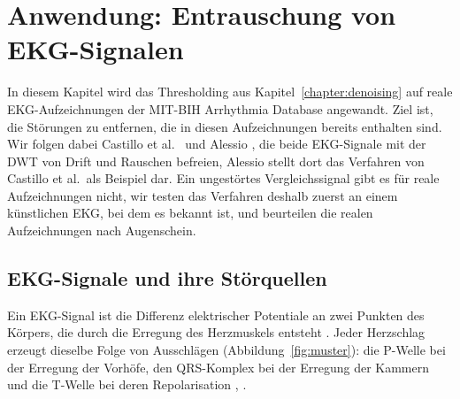 \documentclass[a4paper,11pt,bibliography=totoc,listof=totoc,headinclude=true,cleardoublepage=empty,oneside]{scrbook}
\theoremstyle{plain}
\theoremstyle{definition}
\begin{document}
\chapter{Anwendung: Entrauschung von EKG-Signalen}
\label{chapter:anwendung}

In diesem Kapitel wird das Thresholding aus Kapitel~\ref{chapter:denoising}
auf reale EKG-Aufzeichnungen der MIT-BIH Arrhythmia Database angewandt. Ziel
ist, die Störungen zu entfernen, die in diesen Aufzeichnungen bereits enthalten
sind. Wir folgen dabei Castillo et al.\ \cite{castillo} und Alessio
\cite[Kap.~15.2.4]{alessio}, %
die beide EKG-Signale mit der DWT von Drift und Rauschen befreien, Alessio
stellt dort das Verfahren von Castillo et al.\ als Beispiel dar.
Ein ungestörtes Vergleichssignal gibt es für reale Aufzeichnungen nicht, wir
testen das Verfahren deshalb zuerst an einem künstlichen EKG, bei dem es
bekannt ist, und beurteilen die realen Aufzeichnungen nach Augenschein.

\section{EKG-Signale und ihre Störquellen}
\label{sec:ekg}

Ein EKG-Signal ist die Differenz elektrischer Potentiale an zwei Punkten des
Körpers, die durch die Erregung des Herzmuskels entsteht
\cite[Kap.~2.2]{gacek}. %
Jeder Herzschlag erzeugt dieselbe Folge von Ausschlägen
(Abbildung~\ref{fig:muster}): die P-Welle bei der Erregung der Vorhöfe, den
QRS-Komplex bei der Erregung der Kammern und die T-Welle bei deren
Repolarisation \cite[Abb.~2.1]{gacek}, %
\cite[Kap.~2.1]{rebstadt}. %
\end{document}
